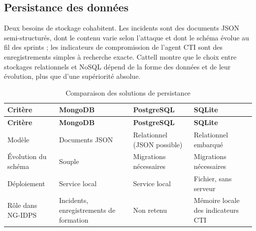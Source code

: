 \subsection{Persistance des données}

Deux besoins de stockage cohabitent. Les incidents sont des documents JSON semi-structurés, dont le contenu varie selon l'attaque et dont le schéma évolue au fil des sprints ; les indicateurs de compromission de l'agent CTI sont des enregistrements simples à recherche exacte. Cattell \cite{cattell2011sql} montre que le choix entre stockages relationnels et NoSQL dépend de la forme des données et de leur évolution, plus que d'une supériorité absolue.


\renewcommand{\arraystretch}{1.25}
\small
\begin{xltabular}{\textwidth}{|>{\raggedright\arraybackslash}X|>{\raggedright\arraybackslash}X|>{\raggedright\arraybackslash}X|>{\raggedright\arraybackslash}X|}

\caption{Comparaison des solutions de persistance}
\label{tab:db} \\

\hline
{}
\textbf{Critère} & \textbf{MongoDB} \cite{mongodb_docs} & \textbf{PostgreSQL} \cite{postgres_docs} & \textbf{SQLite} \cite{sqlite_docs} \\ \hline
\endfirsthead

\hline
{}
\textbf{Critère} & \textbf{MongoDB} \cite{mongodb_docs} & \textbf{PostgreSQL} \cite{postgres_docs} & \textbf{SQLite} \cite{sqlite_docs} \\ \hline
\endhead

Modèle & Documents JSON & Relationnel (JSON possible) & Relationnel embarqué \\ \hline
Évolution du schéma & Souple & Migrations nécessaires & Migrations nécessaires \\ \hline
Déploiement & Service local & Service local & Fichier, sans serveur \\ \hline
Rôle dans NG-IDPS & Incidents, enregistrements de formation & Non retenu & Mémoire locale des indicateurs CTI \\ \hline

\end{xltabular}


